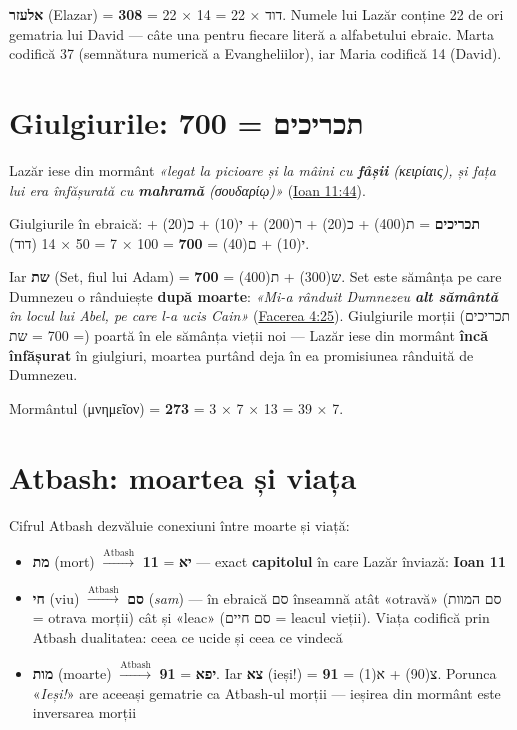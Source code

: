 \documentclass[12pt,a4paper,twoside,openany]{book}
\begin{document}
\textbf{אלעזר} (Elazar) = \textbf{308} = 22 × 14 = 22 × דוד. Numele lui Lazăr conține 22 de ori gematria lui David — câte una pentru fiecare literă a alfabetului ebraic. Marta codifică 37 (semnătura numerică a Evangheliilor), iar Maria codifică 14 (David).

\section{Giulgiurile: תכריכים = 700}

Lazăr iese din mormânt \textit{«legat la picioare și la mâini cu \textbf{fâșii} (κειρίαις), și fața lui era înfășurată cu \textbf{mahramă} (σουδαρίῳ)»} (\href{https://bibliaortodoxa.ro/carte.php?id=35\&cap=11\#44}{Ioan 11:44}).

Giulgiurile în ebraică: \textbf{תכריכים} = ת(400) + כ(20) + ר(200) + י(10) + כ(20) + י(10) + ם(40) = \textbf{700} = 100 × 7 = 50 × 14 (דוד).

Iar \textbf{שת} (Set, fiul lui Adam) = ש(300) + ת(400) = \textbf{700}. Set este sămânța pe care Dumnezeu o rânduiește \textbf{după moarte}: \textit{«Mi-a rânduit Dumnezeu \textbf{alt sământă} în locul lui Abel, pe care l-a ucis Cain»} (\href{https://bibliaortodoxa.ro/carte.php?id=25\&cap=4\#25}{Facerea 4:25}). Giulgiurile morții (תכריכים = 700 = שת) poartă în ele sămânța vieții noi — Lazăr iese din mormânt \textbf{încă înfășurat} în giulgiuri, moartea purtând deja în ea promisiunea rânduită de Dumnezeu.

Mormântul (μνημεῖον) = \textbf{273} = 3 × 7 × 13 = 39 × 7.

\section{Atbash: moartea și viața}

Cifrul Atbash dezvăluie conexiuni între moarte și viață:

\begin{itemize}
  \item \textbf{מת} (mort) $\xrightarrow{\text{Atbash}}$ \textbf{יא} = \textbf{11} — exact \textbf{capitolul} în care Lazăr înviază: \textbf{Ioan 11}
  \item \textbf{חי} (viu) $\xrightarrow{\text{Atbash}}$ \textbf{סם} (\textit{sam}) — în ebraică סם înseamnă atât «otravă» (סם המוות = otrava morții) cât și «leac» (סם חיים = leacul vieții). Viața codifică prin Atbash dualitatea: ceea ce ucide și ceea ce vindecă
  \item \textbf{מות} (moarte) $\xrightarrow{\text{Atbash}}$ \textbf{יפא} = \textbf{91}. Iar \textbf{צא} (ieși!) = צ(90) + א(1) = \textbf{91}. Porunca «\textit{Ieși!}» are aceeași gematrie ca Atbash-ul morții — ieșirea din mormânt este inversarea morții
\end{itemize}
\end{document}

